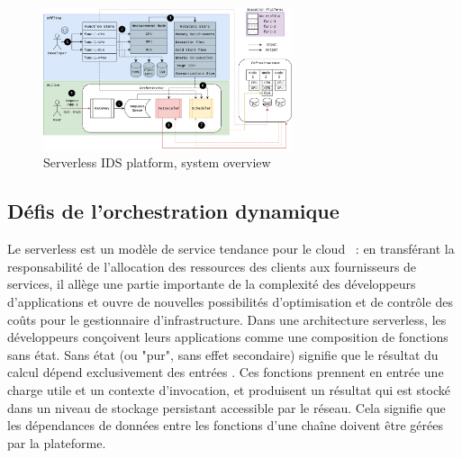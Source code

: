 \begin{figure}[t]
\centering
\includegraphics[width=0.65\textwidth]{5_Chapitre5/figures/serverless-platform-storage.png}
\caption{Serverless IDS platform, system overview}
\label{figure:herocache-serverless-platform}
\end{figure}

\subsection{Défis de l'orchestration dynamique}

Le serverless est un modèle de service tendance pour le cloud~\cite{Lannurien2023} : en transférant la responsabilité de l'allocation des ressources des clients aux fournisseurs de services, il allège une partie importante de la complexité des développeurs d'applications et ouvre de nouvelles possibilités d'optimisation et de contrôle des coûts pour le gestionnaire d'infrastructure.
Dans une architecture serverless, les développeurs conçoivent leurs applications comme une composition de fonctions sans état. Sans état (ou "pur", sans effet secondaire) signifie que le résultat du calcul dépend exclusivement des entrées \cite{burckhardtNetheriteEfficientExecution}. Ces fonctions prennent en entrée une charge utile et un contexte d'invocation, et produisent un résultat qui est stocké dans un niveau de stockage persistant accessible par le réseau. Cela signifie que les dépendances de données entre les fonctions d'une chaîne doivent être gérées par la plateforme.


